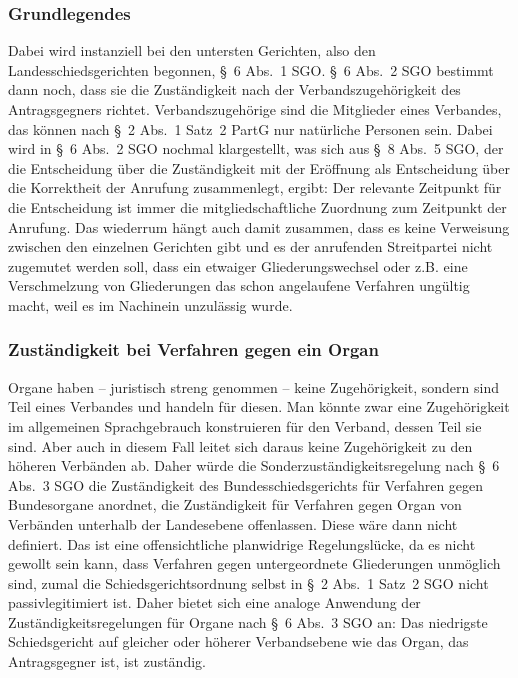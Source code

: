 \subsubsection{Grundlegendes}
\label{Standardworkflow:Zustaendigkeit:Grundlegendes}
Dabei wird instanziell bei den untersten Gerichten, also den Landesschiedsgerichten begonnen, \S~6 Abs.~1 SGO.
\S~6 Abs.~2 SGO bestimmt dann noch, dass sie die Zuständigkeit nach der Verbandszugehörigkeit des Antragsgegners richtet.
Verbandszugehörige sind die Mitglieder eines Verbandes, das können nach \S~2 Abs.~1 Satz~2 PartG nur natürliche Personen sein.
Dabei wird in \S~6 Abs.~2 SGO nochmal klargestellt, was sich aus \S~8 Abs.~5 SGO, der die Entscheidung über die Zuständigkeit mit der Eröffnung als Entscheidung über die Korrektheit der Anrufung zusammenlegt, ergibt: Der relevante Zeitpunkt für die Entscheidung ist immer die mitgliedschaftliche Zuordnung zum Zeitpunkt der Anrufung.
Das wiederrum hängt auch damit zusammen, dass es keine Verweisung zwischen den einzelnen Gerichten gibt und es der anrufenden Streitpartei nicht zugemutet werden soll, dass ein etwaiger Gliederungswechsel oder z.B. eine Verschmelzung von Gliederungen das schon angelaufene Verfahren ungültig macht, weil es im Nachinein unzulässig wurde.

\subsubsection{Zuständigkeit bei Verfahren gegen ein Organ}
\label{Standardworkflow:Zustaendigkeit:Organ}
Organe haben -- juristisch streng genommen -- keine Zugehörigkeit, sondern sind Teil eines Verbandes und handeln für diesen.
Man könnte zwar eine Zugehörigkeit im allgemeinen Sprachgebrauch konstruieren für den Verband, dessen Teil sie sind.
Aber auch in diesem Fall leitet sich daraus keine Zugehörigkeit zu den höheren Verbänden ab.
Daher würde die Sonderzuständigkeitsregelung nach \S~6 Abs.~3 SGO die Zuständigkeit des Bundesschiedsgerichts für Verfahren gegen Bundesorgane anordnet, die Zuständigkeit für Verfahren gegen Organ von Verbänden unterhalb der Landesebene offenlassen.
Diese wäre dann nicht definiert. Das ist eine offensichtliche planwidrige Regelungslücke, da es nicht gewollt sein kann, dass Verfahren gegen untergeordnete Gliederungen unmöglich sind, zumal die Schiedsgerichtsordnung selbst in \S~2 Abs.~1 Satz~2 SGO nicht passivlegitimiert ist.
Daher bietet sich eine analoge Anwendung der Zuständigkeitsregelungen für Organe nach \S~6 Abs.~3 SGO an: Das niedrigste Schiedsgericht auf gleicher oder höherer Verbandsebene wie das Organ, das Antragsgegner ist, ist zuständig.

